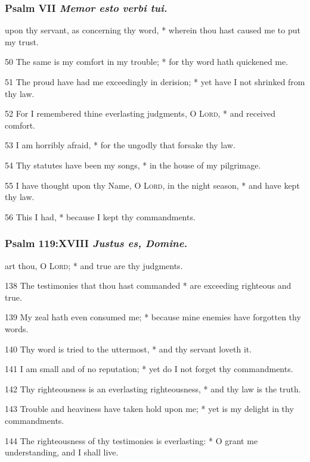 \subsubsection{Psalm VII \textit{Memor esto verbi tui.}}
 upon thy servant, as concerning thy word, * wherein thou hast caused me to put my trust.
\par
    50 The same is my comfort in my trouble; * for thy word hath quickened me.
\par
    51 The proud have had me exceedingly in derision; * yet have I not shrinked from thy law.
\par
    52 For I remembered thine everlasting judgments, O \textsc{Lord}, * and received comfort.
\par
    53 I am horribly afraid, * for the ungodly that forsake thy law.
\par
    54 Thy statutes have been my songs, * in the house of my pilgrimage.
\par
    55 I have thought upon thy Name, O \textsc{Lord}, in the night season, * and have kept thy law.
\par
    56 This I had, * because I kept thy commandments.
\subsubsection{Psalm 119:XVIII \textit{Justus es, Domine.}}
 art thou, O \textsc{Lord}; * and true are thy judgments.
\par
    138 The testimonies that thou hast commanded * are exceeding righteous and true.
\par
    139 My zeal hath even consumed me; * because mine enemies have forgotten thy words.
\par
    140 Thy word is tried to the uttermost, * and thy servant loveth it.
\par
    141 I am small and of no reputation; * yet do I not forget thy commandments.
\par
    142 Thy righteousness is an everlasting righteousness, * and thy law is the truth.
\par
    143 Trouble and heaviness have taken hold upon me; * yet is my delight in thy commandments.
\par
    144 The righteousness of thy testimonies is everlasting: * O grant me understanding, and I shall live.
